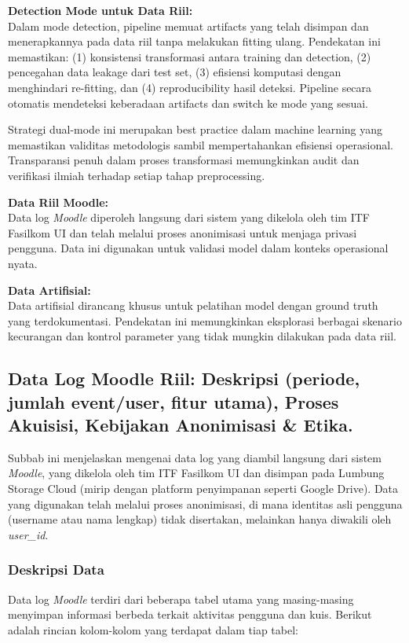 \textbf{Detection Mode untuk Data Riil:} \\
Dalam mode detection, pipeline memuat artifacts yang telah disimpan dan menerapkannya pada data riil tanpa melakukan fitting ulang. Pendekatan ini memastikan: (1) konsistensi transformasi antara training dan detection, (2) pencegahan data leakage dari test set, (3) efisiensi komputasi dengan menghindari re-fitting, dan (4) reproducibility hasil deteksi. Pipeline secara otomatis mendeteksi keberadaan artifacts dan switch ke mode yang sesuai.

Strategi dual-mode ini merupakan best practice dalam machine learning yang memastikan validitas metodologis sambil mempertahankan efisiensi operasional. Transparansi penuh dalam proses transformasi memungkinkan audit dan verifikasi ilmiah terhadap setiap tahap preprocessing.

\textbf{Data Riil Moodle:} \\
Data log \textit{Moodle} diperoleh langsung dari sistem yang dikelola oleh tim ITF Fasilkom UI dan telah melalui proses anonimisasi untuk menjaga privasi pengguna. Data ini digunakan untuk validasi model dalam konteks operasional nyata.

\textbf{Data Artifisial:} \\
Data artifisial dirancang khusus untuk pelatihan model dengan ground truth yang terdokumentasi. Pendekatan ini memungkinkan eksplorasi berbagai skenario kecurangan dan kontrol parameter yang tidak mungkin dilakukan pada data riil.

\subsection{Data Log Moodle Riil: Deskripsi (periode, jumlah event/user, fitur utama), Proses Akuisisi, Kebijakan Anonimisasi \& Etika.}
\label{sec:logRiil}
Subbab ini menjelaskan mengenai data log yang diambil langsung dari sistem \textit{Moodle}, yang dikelola oleh tim ITF Fasilkom UI dan disimpan pada Lumbung Storage Cloud (mirip dengan platform penyimpanan seperti Google Drive). Data yang digunakan telah melalui proses anonimisasi, di mana identitas asli pengguna (username atau nama lengkap) tidak disertakan, melainkan hanya diwakili oleh \textit{user\_id}.

\subsubsection{Deskripsi Data}
\label{sec:deskripsiData}
Data log \textit{Moodle} terdiri dari beberapa tabel utama yang masing-masing menyimpan informasi berbeda terkait aktivitas pengguna dan kuis. Berikut adalah rincian kolom-kolom yang terdapat dalam tiap tabel:

